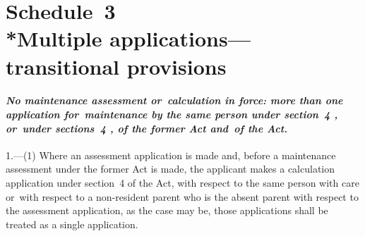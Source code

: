\documentclass[12pt,a4paper]{article}
\begin{document}

\part[Schedule~3 --- Multiple applications---transitional provisions]{Schedule~3\\*Multiple applications---\hspace{0pt}transitional provisions}

\renewcommand\parthead{--- Schedule~3}


\subsection*{\itshape\sloppy No maintenance assessment or~calculation in force: more than one application for~maintenance by the same person under section~4%
, or~under sections~4%
, of the former Act and~of the Act.}

1.---(1)  Where an assessment application is made and, before a maintenance assessment under the former Act is made, the applicant makes 
a calculation application under section~4 
of the Act, with respect to the same person with care or~with respect to a non-resident parent who is the absent parent with respect to the assessment application, as the case may be, those applications shall be treated as a single application.
\end{document}
